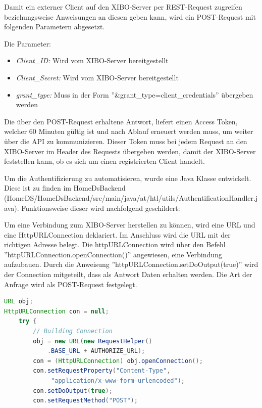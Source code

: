 Damit ein externer Client auf den XIBO-Server per REST-Request zugreifen beziehungsweise Anweisungen an diesen geben kann, wird ein POST-Request mit folgenden Parametern abgesetzt.

Die Parameter: 
\begin{itemize}
	\item {\em Client\_ID:} Wird vom XIBO-Server bereitgestellt
	\item {\em Client\_Secret:} Wird vom XIBO-Server bereitgestellt
	\item{\em grant\_type:} Muss in der Form ''&grant\_type=client\_credentials'' übergeben werden 
\end{itemize}

Die über den POST-Request erhaltene Antwort, liefert einen Access Token, welcher 60 Minuten gültig ist und nach Ablauf erneuert werden muss, um weiter über die API zu kommunizieren.
Dieser Token muss bei jedem Request an den XIBO-Server im Header des Requests übergeben werden, damit der XIBO-Server feststellen kann, ob es sich um einen registrierten Client handelt.


Um die Authentifizierung zu automatisieren, wurde eine Java Klasse entwickelt. Diese ist zu finden im HomeDsBackend (HomeDS/HomeDsBackend/src/main/java/at/htl/utils/AuthentificationHandler.java). Funktionsweise dieser wird nachfolgend geschildert: 

Um eine Verbindung zum XIBO-Server herstellen zu können, wird eine URL und eine HttpURLConnection deklariert. Im Anschluss wird die URL mit der richtigen Adresse belegt. Die httpURLConnection wird über den Befehl ''httpURLConnection.openConnection()'' angewiesen, eine Verbindung aufzubauen. Durch die Anweisung ''httpURLConnection.setDoOutput(true)'' wird der Connection mitgeteilt, dass als Antwort Daten erhalten werden. Die Art der Anfrage wird als POST-Request festgelegt.  \citep{httpurlconnection}

\begin{lstlisting}[language=Java,caption={Erstellen der Verbindung zum Server}]
URL obj;
HttpURLConnection con = null;
	try {
    	// Building Connection
        obj = new URL(new RequestHelper()
        	.BASE_URL + AUTHORIZE_URL);
       	con = (HttpURLConnection) obj.openConnection();
        con.setRequestProperty("Content-Type",
             "application/x-www-form-urlencoded");    
        con.setDoOutput(true);
        con.setRequestMethod("POST");
\end{lstlisting}

